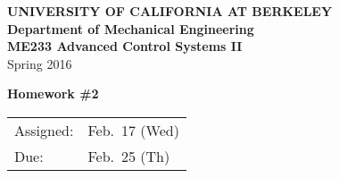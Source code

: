 \documentclass[letterpaper,12pt]{article}
\begin{document}
\begin{center}
    {\bf UNIVERSITY OF CALIFORNIA AT BERKELEY}\\
    {\bf Department of Mechanical Engineering}\\
    {\bf ME233  Advanced Control Systems II}\\
    Spring 2016\\
\end{center}
\noindent
{\Large \bf Homework \#2 }\\[-3em]
\begin{flushright}
\begin{tabular} {l l}
    Assigned: &  Feb.\ 17 (Wed)\\
    Due: & Feb.\ 25 (Th)
\end{tabular}
\end{flushright}
\end{document}
